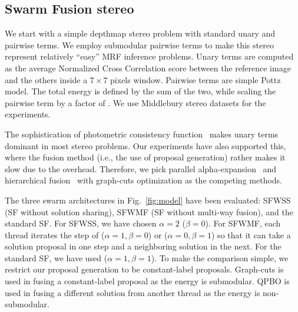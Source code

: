 \subsection{Swarm Fusion stereo}
We start with a simple depthmap stereo problem with standard unary and
pairwise terms. We employ submodular pairwise terms to make this stereo
represent relatively ``easy'' MRF inference problems.
%
Unary terms are computed as the average Normalized Cross Correlation
score between the reference image and the others inside a $7\times 7$
pixels window. Pairwise terms are simple Pottz model. The total energy
is defined by the sum of the two, while scaling the pairwise term by a
factor of .
%
We use Middlebury stereo datasets for the experiments.


\noindent The sophistication of photometric consistency
function~\cite{mvs_furukawa_survey} makes unary terms dominant in most
stereo problems.  Our experiments have also supported this, where the
fusion method (i.e., the use of proposal generation) rather makes it slow
due to the overhead.  Therefore, we pick parallel
alpha-expansion~\cite{delong} and hierarchical fusion~\cite{delong,olga}
with graph-cuts optimization as the competing methods.


\noindent The three swarm architectures in Fig.~\ref{fig:model} have
been evaluated: SFWSS (SF without solution sharing), SFWMF (SF without
multi-way fusion), and the standard SF.
%
For SFWSS, we have chosen $\alpha=2$ ($\beta=0$). For SFWMF, each thread
iterates the step of ($\alpha=1, \beta=0$) or ($\alpha=0, \beta=1$) so
that it can take a solution proposal in one step and a neighboring
solution in the next. For the standard SF, we have used ($\alpha=1, \beta=1$).
%
%
%
%
To make the comparison simple, we restrict our proposal
generation to be constant-label proposals. Graph-cuts is used in fusing
a constant-label proposal as the energy is submodular. QPBO is used in
fusing a different solution from another thread as the energy is
non-submodular.
%
